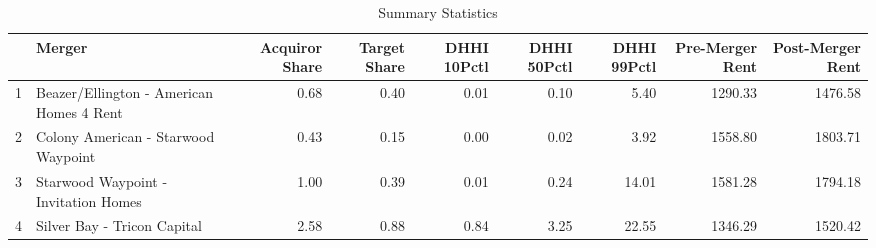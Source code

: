 \begin{table}[ht]
\centering
\begin{tabular}{rlrrrrrrr}
  \hline
 & Merger & Acquiror Share & Target Share & DHHI 10Pctl & DHHI 50Pctl & DHHI 99Pctl & Pre-Merger Rent & Post-Merger Rent \\ 
  \hline
1 & Beazer/Ellington - American Homes 4 Rent & 0.68 & 0.40 & 0.01 & 0.10 & 5.40 & 1290.33 & 1476.58 \\ 
  2 & Colony American - Starwood Waypoint & 0.43 & 0.15 & 0.00 & 0.02 & 3.92 & 1558.80 & 1803.71 \\ 
  3 & Starwood Waypoint - Invitation Homes & 1.00 & 0.39 & 0.01 & 0.24 & 14.01 & 1581.28 & 1794.18 \\ 
  4 & Silver Bay - Tricon Capital & 2.58 & 0.88 & 0.84 & 3.25 & 22.55 & 1346.29 & 1520.42 \\ 
   \hline
\end{tabular}
\caption{Summary Statistics} 
\end{table}
